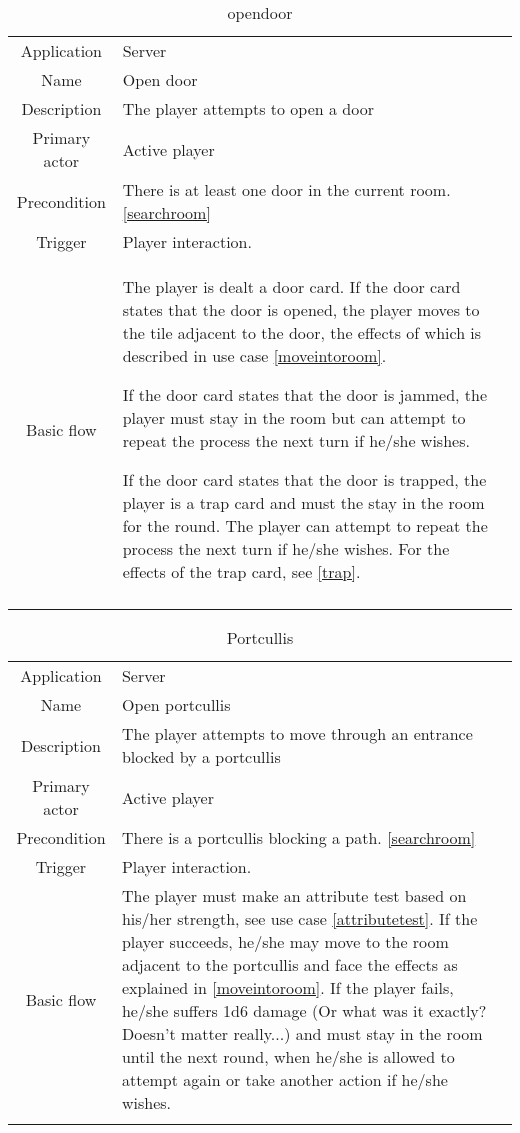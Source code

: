 \begin{table}
\caption{opendoor}
\label{opendoor}
\begin{tabular}{|c| p{9cm}|c}
\hline
Application & Server & \\
Name & Open door & \\
Description & The player attempts to open a door & \\
Primary actor & Active player & \\
Precondition & There is at least one door in the current room. \ref{searchroom} & \\
Trigger & Player interaction.  & \\ \hline
Basic flow & The player is dealt a door card. If the door card states that the door is opened, the player moves to the tile adjacent to the door, the effects of which is described in use case \ref{moveintoroom}.

If the door card states that the door is jammed, the player must stay in the room but can attempt to repeat the process the next turn if he/she wishes.

If the door card states that the door is trapped, the player is a trap card and must the stay in the room for the round. The player can attempt to repeat the process the next turn if he/she wishes. For the effects of the trap card, see \ref{trap}. & \\ \hline
 \\
\hline
\end{tabular}
\end{table}

\begin{table}
\caption{Portcullis}
\label{portcullis}
\begin{tabular}{|c| p{9cm}|c}
\hline
Application & Server & \\
Name & Open portcullis & \\
Description & The player attempts to move through an entrance blocked by a portcullis & \\
Primary actor & Active player & \\
Precondition & There is a portcullis blocking a path. \ref{searchroom} & \\
Trigger & Player interaction. & \\ \hline
Basic flow & The player must make an attribute test based on his/her strength, see use case \ref{attributetest}. If the player succeeds, he/she may move to the room adjacent to the portcullis and face the effects as explained in \ref{moveintoroom}. If the player fails, he/she suffers 1d6 damage (Or what was it exactly? Doesn't matter really...) and must stay in the room until the next round, when he/she is allowed to attempt again or take another action if he/she wishes. & \\ \hline
 \\
\hline
\end{tabular}
\end{table}


